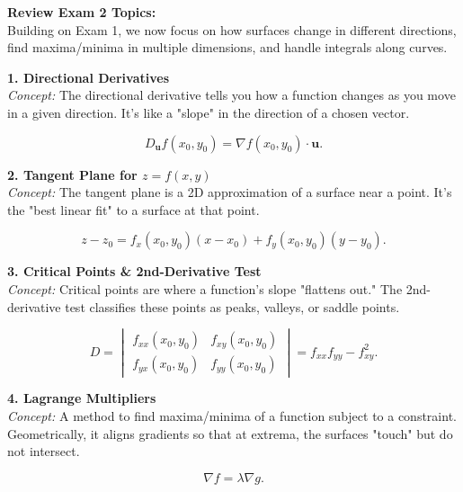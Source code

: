 \documentclass[9pt]{article}
\begin{document}
\begin{multicols}{2}
\footnotesize

\noindent \textbf{Review Exam 2 Topics:}\\
Building on Exam 1, we now focus on how surfaces change in different directions, find maxima/minima in multiple dimensions, and handle integrals along curves.

\begin{tcolorbox}[title=, colframe=brightpink]
\textbf{1. Directional Derivatives}\\
\textit{Concept:} The directional derivative tells you how a function changes as you move in a given direction. It's like a "slope" in the direction of a chosen vector.

\[
D_{\mathbf{u}} f(x_0,y_0)=\nabla f(x_0,y_0)\cdot \mathbf{u}.
\]
\end{tcolorbox}

\begin{tcolorbox}[title=, colframe=brightyellow]
\textbf{2. Tangent Plane for $z=f(x,y)$}\\
\textit{Concept:} The tangent plane is a 2D approximation of a surface near a point. It's the "best linear fit" to a surface at that point.

\[
z-z_0=f_x(x_0,y_0)(x-x_0)+f_y(x_0,y_0)(y-y_0).
\]
\end{tcolorbox}

\begin{tcolorbox}[title=, colframe=brightblue]
\textbf{3. Critical Points \& 2nd-Derivative Test}\\
\textit{Concept:} Critical points are where a function's slope "flattens out." The 2nd-derivative test classifies these points as peaks, valleys, or saddle points.

\[
D=\begin{vmatrix}
f_{xx}(x_0,y_0) & f_{xy}(x_0,y_0)\\
f_{yx}(x_0,y_0) & f_{yy}(x_0,y_0)
\end{vmatrix}=f_{xx}f_{yy}-f_{xy}^2.
\]
\end{tcolorbox}

\begin{tcolorbox}[title=, colframe=brightgreen]
\textbf{4. Lagrange Multipliers}\\
\textit{Concept:} A method to find maxima/minima of a function subject to a constraint. Geometrically, it aligns gradients so that at extrema, the surfaces "touch" but do not intersect.

\[
\nabla f=\lambda \nabla g.
\]
\end{tcolorbox}


\end{multicols}
\end{document}
